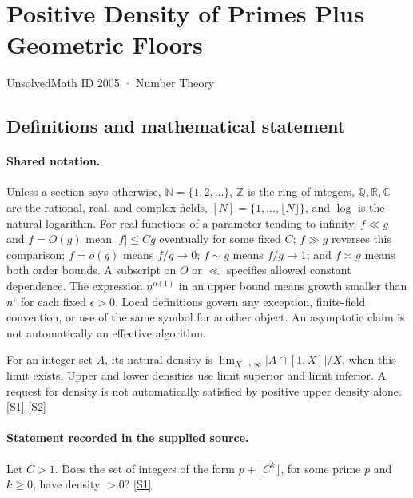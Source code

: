 \documentclass[11pt,a4paper]{article}
\newcommand{\N}{\mathbb{N}}
\newcommand{\Z}{\mathbb{Z}}
\newcommand{\Q}{\mathbb{Q}}
\newcommand{\R}{\mathbb{R}}
\newcommand{\C}{\mathbb{C}}
\newcommand{\sref}[2]{\hyperlink{source:#1:#2}{[S#2]}}
\begin{document}

\setcounter{section}{2004}

\section{Positive Density of Primes Plus Geometric Floors}\label{2005}

{\small\sffamily UnsolvedMath ID 2005 · Number Theory}

\subsection{Definitions and mathematical statement}

\paragraph{Shared notation.}Unless a section says otherwise, $\N=\{1,2,\ldots\}$,
$\Z$ is the ring of integers, $\Q,\R,\C$ are the rational, real, and complex
fields, $[N]=\{1,\ldots,\lfloor N\rfloor\}$, and $\log$ is the natural
logarithm. For real functions of a parameter tending to infinity,
$f\ll g$ and $f=O(g)$ mean $|f|\leq Cg$ eventually for some fixed $C$;
$f\gg g$ reverses this comparison; $f=o(g)$ means $f/g\to0$;
$f\sim g$ means $f/g\to1$; and $f\asymp g$ means both order bounds.
A subscript on $O$ or $\ll$ specifies allowed constant dependence.
The expression $n^{o(1)}$ in an upper bound means growth smaller than
$n^\epsilon$ for each fixed $\epsilon>0$. Local definitions govern any
exception, finite-field convention, or use of the same symbol for another
object. An asymptotic claim is not automatically an effective algorithm.



For an integer set $A$, its natural density is $\lim_{X\to\infty}|A\cap[1,X]|/X$, when this limit exists. Upper and lower densities use limit superior and limit inferior. A request for density is not automatically satisfied by positive upper density alone. \sref{2005}{1} \sref{2005}{2}

\paragraph{Statement recorded in the supplied source.}
Let $C>1$. Does the set of integers of the form $p+\lfloor C^k\rfloor$, for some prime $p$ and $k\geq 0$, have density $>0$? \sref{2005}{1}
\end{document}
